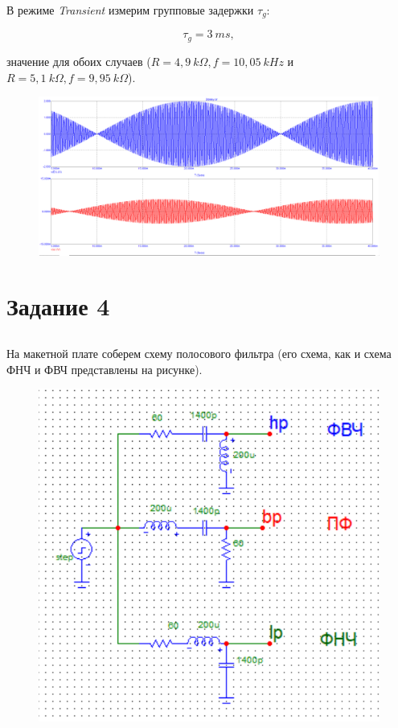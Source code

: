 \documentclass{article}
\begin{document}
В режиме \textit{Transient} измерим групповые задержки $\tau_g$:

\[\tau_g = 3 \: ms,\]

значение для обоих случаев ($R = 4,9 \: k\Omega, f = 10,05 \: kHz$ и $R = 5,1 \: k\Omega, f = 9,95 \: k\Omega$).

\begin{figure}[H]
\centering
\includegraphics[scale=0.4]{2tdelay_AC2.png}
\label{fig:Image1}
\end{figure}

\section {Задание 4}


\subsection{}
На макетной плате соберем схему полосового фильтра (его схема, как и схема ФНЧ и ФВЧ представлены на рисунке).

\begin{figure}[H]
\centering
\includegraphics[scale=0.4]{rlc2pole_img.png}
\label{fig:Image1}
\end{figure}
\end{document}
